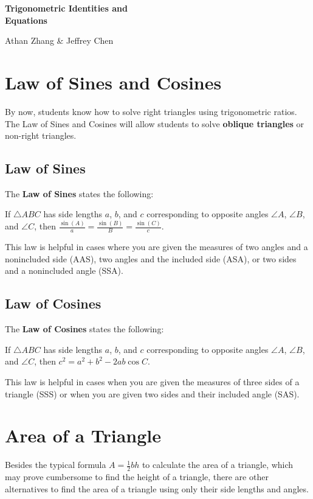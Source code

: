 \documentclass[11pt]{article}
\begin{document}
\textbf{\Huge Trigonometric Identities and \\ Equations}

Athan Zhang \& Jeffrey Chen

\section{Law of Sines and Cosines}
By now, students know how to solve right triangles using trigonometric ratios. The Law of Sines and Cosines will allow students to solve \textbf{oblique triangles} or non-right triangles. 

\subsection{Law of Sines}
The \textbf{Law of Sines} states the following:

\begin{center}
If $\triangle ABC$ has side lengths $a$, $b$, and $c$ corresponding to opposite angles $\angle A$, $\angle B$, and $\angle C$, then $\frac{\sin(A)}{a} = \frac{\sin(B)}{B} = \frac{\sin(C)}{c}$.
\end{center}
This law is helpful in cases where you are given the measures of two angles and a nonincluded side (AAS), two angles and the included side (ASA), or two sides and a nonincluded angle (SSA).

\subsection{Law of Cosines}
The \textbf{Law of Cosines} states the following:
\begin{center}
If $\triangle ABC$ has side lengths $a$, $b$, and $c$ corresponding to opposite angles $\angle A$, $\angle B$, and $\angle C$, then $c^2 = a^2 + b^2 - 2ab\cos C$.
\end{center}
This law is helpful in cases when you are given the measures of three sides of a triangle (SSS) or when you are given two sides and their included angle (SAS).

\section{Area of a Triangle}
Besides the typical formula $A = \frac{1}{2}bh$ to calculate the area of a triangle, which may prove cumbersome to find the height of a triangle, there are other alternatives to find the area of a triangle using only their side lengths and angles.
\end{document}
